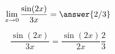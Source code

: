 \documentclass{ximera}
\author{Steven Gubkin}
\begin{document}
\begin{exercise}

\[\lim_{x \to 0} \frac{\sin(2x)}{3x} = \answer{2/3}\]

\begin{hint}
	\[\frac{\sin(2x)}{3x} = \frac{\sin(2x)}{2x} \frac{2}{3}\]
\end{hint}

\end{exercise}
\end{document}
